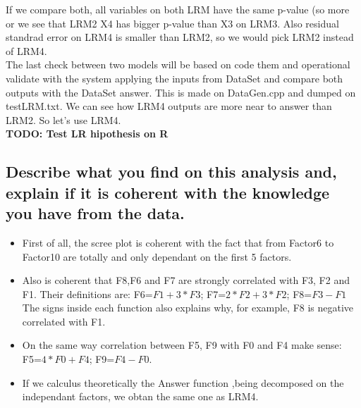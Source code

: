 \documentclass[12pt]{article}
\begin{document}
If we compare both, all variables on both LRM have the same p-value (so more or we see that LRM2 X4 has bigger p-value than X3 on LRM3. Also residual standrad error on LRM4 is smaller than LRM2, so we would pick LRM2 instead of LRM4.\\
The last check between two models will be based on code them and operational validate with the system applying the inputs from DataSet and compare both outputs with the DataSet answer. This is made on DataGen.cpp and dumped on testLRM.txt. We can see how LRM4 outputs are more near to answer than LRM2. So let's use LRM4. \\
\textbf{TODO: Test LR hipothesis on R}

\subsection {Describe what you find on this analysis and, explain if it is coherent with the knowledge you have from the data.}
\begin{itemize}
\item  First of all, the scree plot is coherent with the fact that from Factor6 to Factor10 are totally and only dependant on the first 5 factors.
\item Also is coherent that F8,F6 and F7 are strongly correlated with F3, F2 and F1. Their definitions are: F6=$F1 + 3*F3$; F7=$2*F2 + 3*F2$; F8=$F3 - F1$
\\The signs inside each function also explains why, for example, F8 is negative correlated with F1.
\item On the same way correlation between F5, F9 with F0 and F4 make sense:
F5=$4*F0 + F4$; F9=$F4 - F0$.
\item If we calculus theoretically the Answer function ,being decomposed on the independant factors, we obtan the same one as LRM4.

\end{itemize}
\newpage
\end{document}
